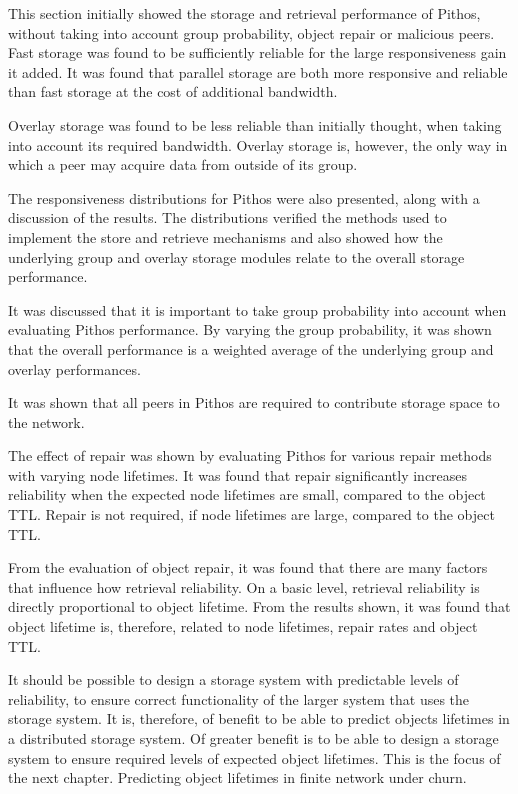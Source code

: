 This section initially showed the storage and retrieval performance of Pithos, without taking into account group probability, object repair or malicious peers. Fast storage was found to be sufficiently reliable for the large responsiveness gain it added. It was found that parallel storage are both more responsive and reliable than fast storage at the cost of additional bandwidth.

Overlay storage was found to be less reliable than initially thought, when taking into account its required bandwidth. Overlay storage is, however, the only way in which a peer may acquire data from outside of its group.

The responsiveness distributions for Pithos were also presented, along with a discussion of the results. The distributions verified the methods used to implement the store and retrieve mechanisms and also showed how the underlying group and overlay storage modules relate to the overall storage performance.

It was discussed that it is important to take group probability into account when evaluating Pithos performance. By varying the group probability, it was shown that the overall performance is a weighted average of the underlying group and overlay performances.

It was shown that all peers in Pithos are required to contribute storage space to the network.

The effect of repair was shown by evaluating Pithos for various repair methods with varying node lifetimes. It was found that repair significantly increases reliability when the expected node lifetimes are small, compared to the object TTL. Repair is not required, if node lifetimes are large, compared to the object TTL.

From the evaluation of object repair, it was found that there are many factors that influence how retrieval reliability. On a basic level, retrieval reliability is directly proportional to object lifetime. From the results shown, it was found that object lifetime is, therefore, related to node lifetimes, repair rates and object TTL.

It should be possible to design a storage system with predictable levels of reliability, to ensure correct functionality of the larger system that uses the storage system. It is, therefore, of benefit to be able to predict objects lifetimes in a distributed storage system. Of greater benefit is to be able to design a storage system to ensure required levels of expected object lifetimes. This is the focus of the next chapter. Predicting object lifetimes in finite network under churn.
